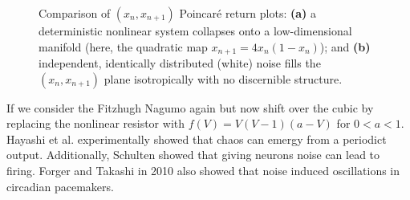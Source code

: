 \documentclass{article}
\theoremstyle{definition}
\begin{document}
\begin{figure}[htbp]
    \caption{Comparison of $(x_n, x_{n+1})$ Poincar\'e return plots: \textbf{(a)} a deterministic nonlinear system collapses onto a low-dimensional manifold (here, the quadratic map $x_{n+1} = 4x_n(1 - x_n)$); and \textbf{(b)} independent, identically distributed (white) noise fills the $(x_n, x_{n+1})$ plane isotropically with no discernible structure.}
    \label{fig:poincare_comparison}
\end{figure}
\noindent If we consider the Fitzhugh Nagumo again but now shift over the cubic by replacing the nonlinear resistor with $f(V) = V(V-1)(a-V)$ for $0<a<1$. Hayashi et al. experimentally showed that chaos can emergy from a periodict output. Additionally, Schulten showed that giving neurons noise can lead to firing. Forger and Takashi in 2010 also showed that noise induced oscillations in circadian pacemakers.
\end{document}
